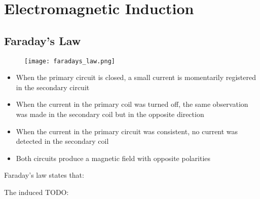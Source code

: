 \section{Electromagnetic Induction} \label{04/03/2025}

	\subsection{Faraday's Law}
		\begin{figure}[htbp]
			\centering
			\texttt{[image: faradays\_law.png]}
		\end{figure}

		\begin{itemize}
			\item When the primary circuit is closed, a small current is momentarily registered in the secondary circuit
			\item When the current in the primary coil was turned off, the same observation was made in the secondary coil but in the opposite direction
			\item When the current in the primary circuit was consistent, no current was detected in the secondary coil
			\item Both circuits produce a magnetic field with opposite polarities
		\end{itemize}
		
		Faraday's law states that:

		\begin{center}
			\large The induced TODO:
		\end{center}

	
